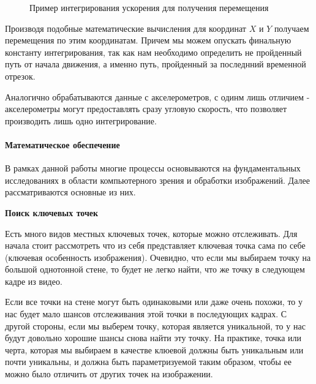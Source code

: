 \begin{figure}[!htb]
\caption{Пример интегрирования ускорения для получения перемещения}
\label{pic:integral}
\end{figure}


Производя подобные математические вычисления для координат $X$ и 
$Y$ получаем перемещения по этим координатам. Причем мы можем опускать финальную константу интегрирования, так как нам необходимо определить не пройденный путь от начала движения, а именно путь, пройденный за последнний временной отрезок. 

Аналогично обрабатываются данные с акселерометров, с одинм лишь отличием - акселерометры могут предоставлять сразу угловую скорость, что позволяет производить лишь одно интегрирование.


\paragraph{Математическое обеспечение}\label{math}

В рамках данной работы многие процессы основываются на фундаментальных исследованиях в области компьютерного зрения и обработки изображений. Далее рассматриваются основные из них.

\textbf{Поиск ключевых точек}

Есть много видов местных ключевых точек, которые можно отслеживать. Для начала стоит рассмотреть что из себя представляет ключевая точка сама по себе (ключевая особенность изображения). Очевидно, что если мы выбираем точку на большой однотонной стене, то будет не легко найти, что же точку в следующем кадре из видео.

Если все точки на стене могут быть одинаковыми или даже очень похожи, то у нас будет мало шансов отслеживания этой точки в последующих кадрах. С другой стороны, если мы выберем точку, которая является уникальной, то у нас будут довольно хорошие шансы снова найти эту точку. На практике, точка или черта, которая мы выбираем в качестве клюевой должны быть уникальным или почти уникальны, и должна быть параметризуемой таким образом, чтобы ее можно было отличить от других точек на изображении.

